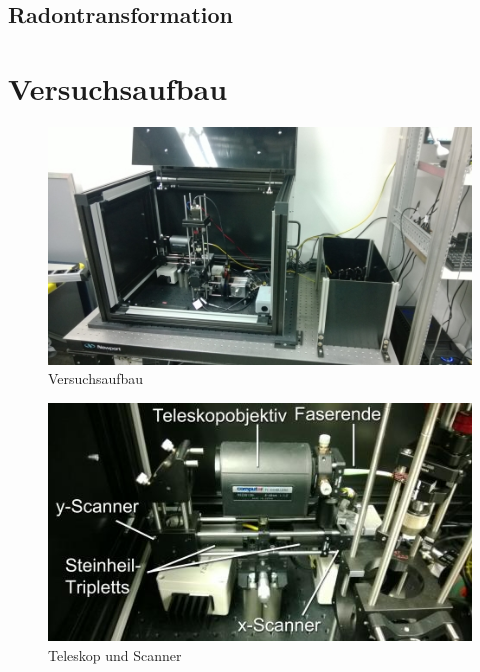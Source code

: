 \subsection{Radontransformation}

\section{Versuchsaufbau}

\begin{minipage}{\linewidth}
\begin{figure}[H]
	\centering
\includegraphics[width=1.0\linewidth]{IMAGE/versuchsaufbau.png}
	\caption{Versuchsaufbau}
	\label{fig:versuchsaufbau}
\end{figure} 

\begin{figure}[H]
	\centering
\includegraphics[width=1.0\linewidth]{IMAGE/scanner.jpeg}
	\caption{Teleskop und Scanner}
	\label{fig:scanner}
\end{figure}

\end{minipage}

